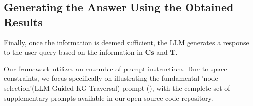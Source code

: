 \subsection{Generating the Answer Using the Obtained Results}
Finally, once the information is deemed sufficient, the LLM generates a response to the user query based on the information in $\boldsymbol{Cs}$ and $\boldsymbol{T}$.

Our framework utilizes an ensemble of prompt instructions. Due to space constraints, we focus specifically on illustrating the fundamental 'node selection'(LLM-Guided KG Traversal) prompt (), with the complete set of supplementary prompts available in our open-source code repository.